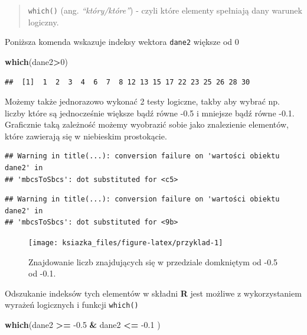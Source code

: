 \documentclass[]{book}
\newenvironment{Shaded}{\begin{snugshade}}{\end{snugshade}}
\newcommand{\KeywordTok}[1]{\textcolor[rgb]{0.13,0.29,0.53}{\textbf{#1}}}
\newcommand{\DecValTok}[1]{\textcolor[rgb]{0.00,0.00,0.81}{#1}}
\newcommand{\FloatTok}[1]{\textcolor[rgb]{0.00,0.00,0.81}{#1}}
\newcommand{\StringTok}[1]{\textcolor[rgb]{0.31,0.60,0.02}{#1}}
\newcommand{\OperatorTok}[1]{\textcolor[rgb]{0.81,0.36,0.00}{\textbf{#1}}}
\newcommand{\NormalTok}[1]{#1}
\theoremstyle{definition}
\theoremstyle{definition}
\theoremstyle{definition}
\theoremstyle{remark}
\begin{document}
\begin{quote}
\texttt{which()} (ang. \emph{``który/które''}) - czyli które elementy
spełniają dany warunek logiczny.
\end{quote}

Poniższa komenda wskazuje indeksy wektora \texttt{dane2} większe od 0

\begin{Shaded}
\begin{Highlighting}[]
\KeywordTok{which}\NormalTok{(dane2}\OperatorTok{>}\DecValTok{0}\NormalTok{)}
\end{Highlighting}
\end{Shaded}

\begin{verbatim}
##  [1]  1  2  3  4  6  7  8 12 13 15 17 22 23 25 26 28 30
\end{verbatim}

Możemy także jednorazowo wykonać 2 testy logiczne, takby aby wybrać np.
liczby które są jednocześnie większe bądź równe -0.5 i mniejsze bądź
równe -0.1. Graficznie taką zależność możemy wyobrazić sobie jako
znalezienie elementów, które zawierają się w niebieskim prostokącie.

\begin{verbatim}
## Warning in title(...): conversion failure on 'wartości obiektu dane2' in
## 'mbcsToSbcs': dot substituted for <c5>
\end{verbatim}

\begin{verbatim}
## Warning in title(...): conversion failure on 'wartości obiektu dane2' in
## 'mbcsToSbcs': dot substituted for <9b>
\end{verbatim}

\begin{figure}

{\centering \texttt{[image: ksiazka\_files/figure-latex/przyklad-1]} 

}

\caption{Znajdowanie liczb znajdujących się w przedziale domkniętym od -0.5 od -0.1.}\label{fig:przyklad}
\end{figure}

Odszukanie indeksów tych elementów w składni \textbf{R} jest możliwe z
wykorzystaniem wyrażeń logicznych i funkcji \texttt{which()}

\begin{Shaded}
\begin{Highlighting}[]
\KeywordTok{which}\NormalTok{(dane2 }\OperatorTok{>=}\StringTok{ }\FloatTok{-0.5} \OperatorTok{&}\StringTok{ }\NormalTok{dane2 }\OperatorTok{<=}\StringTok{ }\FloatTok{-0.1}\NormalTok{ )}
\end{Highlighting}
\end{Shaded}
\end{document}
